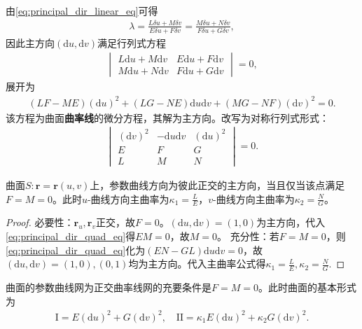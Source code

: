 \documentclass[../../main.tex]{subfiles}%
\begin{document}
由\eqref{eq:principal_dir_linear_eq}可得
\begin{align*}
\lambda=\frac{L\delta u+M\delta v}{E\delta u+F\delta v}=\frac{M\delta u+N\delta v}{F\delta u+G\delta v},
\end{align*}
因此主方向$(\mathrm{d}u,\mathrm{d}v)$满足行列式方程
\begin{align}
\begin{vmatrix}
L\mathrm{d}u+M\mathrm{d}v & E\mathrm{d}u+F\mathrm{d}v\\
M\mathrm{d}u+N\mathrm{d}v & F\mathrm{d}u+G\mathrm{d}v
\end{vmatrix}=0,\label{eq:principal_dir_det_eq}
\end{align}
展开为
\begin{align}
(LF-ME)(\mathrm{d}u)^2+(LG-NE)\mathrm{d}u\mathrm{d}v+(MG-NF)(\mathrm{d}v)^2=0.\label{eq:principal_dir_quad_eq}
\end{align}
该方程为曲面\textbf{曲率线}的微分方程，其解为主方向。改写为对称行列式形式：
\begin{align}
\begin{vmatrix}
(\mathrm{d}v)^2 & -\mathrm{d}u\mathrm{d}v & (\mathrm{d}u)^2\\
E & F & G\\
L & M & N
\end{vmatrix}=0.\label{eq:curvature_line_diff_eq}
\end{align}

\begin{theorem}
曲面$S:\boldsymbol{r}=\boldsymbol{r}(u,v)$上，参数曲线方向为彼此正交的主方向，当且仅当该点满足$F=M=0$。此时$u$-曲线方向主曲率为$\kappa_1=\frac{L}{E}$，$v$-曲线方向主曲率为$\kappa_2=\frac{N}{G}$。
\end{theorem}
\begin{proof}

必要性：$\boldsymbol{r}_u,\boldsymbol{r}_v$正交，故$F=0$。$(\mathrm{d}u,\mathrm{d}v)=(1,0)$为主方向，代入\eqref{eq:principal_dir_quad_eq}得$EM=0$，故$M=0$。
充分性：若$F=M=0$，则\eqref{eq:principal_dir_quad_eq}化为$(EN-GL)\mathrm{d}u\mathrm{d}v=0$，故$(\mathrm{d}u,\mathrm{d}v)=(1,0),(0,1)$均为主方向。代入主曲率公式得$\kappa_1=\frac{L}{E},\kappa_2=\frac{N}{G}$.

\end{proof}

\begin{corollary}
曲面的参数曲线网为正交曲率线网的充要条件是$F=M=0$。此时曲面的基本形式为
\begin{align}
\mathrm{I}=E(\mathrm{d}u)^2+G(\mathrm{d}v)^2,\quad \mathrm{II}=\kappa_1E(\mathrm{d}u)^2+\kappa_2G(\mathrm{d}v)^2.\label{eq:ortho_curvature_line_form}
\end{align}
\end{corollary}
\end{document}

